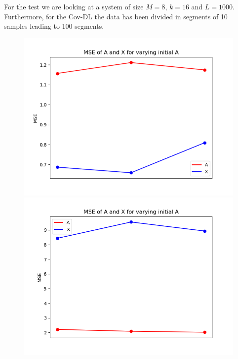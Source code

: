 For the test we are looking at a system of size $M = 8$, $k = 16$ and $L = 1000$. Furthermore, for the Cov-DL the data has been divided in segments of 10 samples leading to 100 segments.
\begin{figure}[H]
\centering
    \begin{minipage}[t]{.45\textwidth}
        \centering
		\includegraphics[scale=0.5]{figures/chapter6/Mix_Error_initial_A_m8_k16_L1000.png}
    \end{minipage} 
    \hfill
    \begin{minipage}[t]{.45\textwidth}
        \centering
		\includegraphics[scale=0.5]{figures/chapter6/AR_Error_initial_A_m8_k16_L1000.png}

\end{minipage}
\end{figure}
